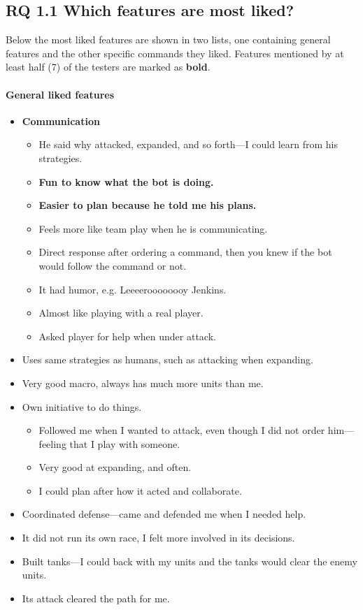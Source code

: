 \subsection{RQ 1.1 Which features are most liked?}
Below the most liked features are shown in two lists, one containing general features and the other
specific commands they liked. Features mentioned by at least half (7) of the testers are marked as
\textbf{bold}.
\paragraph{General liked features}
\begin{itemize}
	\item \textbf{Communication}
	\begin{itemize}
		\item He said why attacked, expanded, and so forth—I could learn from his strategies.
		\item \textbf{Fun to know what the bot is doing.}
		\item \textbf{Easier to plan because he told me his plans.}
		\item Feels more like team play when he is communicating.
		\item Direct response after ordering a command, then you knew if the bot would follow the command or not.
		\item It had humor, e.g. Leeeeroooooooy Jenkins.
		\item Almost like playing with a real player.
		\item Asked player for help when under attack.
	\end{itemize}
	\item Uses same strategies as humans, such as attacking when expanding.
	\item Very good macro, always has much more units than me.
	\item Own initiative to do things.
	\begin{itemize}
		\item Followed me when I wanted to attack, even though I did not order him—feeling that I play with someone.
		\item Very good at expanding, and often.
		\item I could plan after how it acted and collaborate.
	\end{itemize}
	\item Coordinated defense—came and defended me when I needed help.
	\item It did not run its own race, I felt more involved in its decisions.
	\item Built tanks—I could back with my units and the tanks would clear the enemy units.
	\item Its attack cleared the path for me.
\end{itemize}

